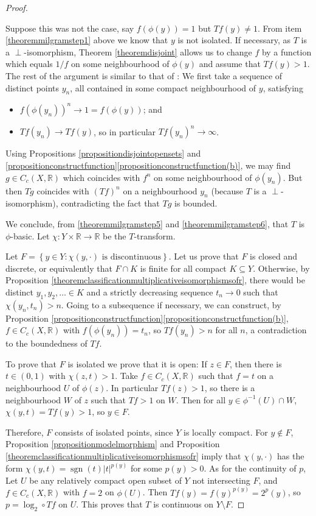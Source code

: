\documentclass[letter,11pt]{amsart}
\theoremstyle{plain}		\newtheorem{theorem}[generalnumbering]{Theorem}
\theoremstyle{plain}		\newtheorem{corollary}[generalnumbering]{Corollary}
\theoremstyle{definition}		\newtheorem{definition}[generalnumbering]{Definition}
\theoremstyle{definition}		\newtheorem{example}[generalnumbering]{Example}
\theoremstyle{plain}		\newtheorem{proposition}[generalnumbering]{Proposition}
\theoremstyle{plain}		\newtheorem{lemma}[generalnumbering]{Lemma}
\theoremstyle{definition}
\begin{document}
\begin{proof}
\begin{enumerate}[label=\arabic*.]
		Suppose this was not the case, say $f(\phi(y))=1$ but $Tf(y)\neq 1$. From item \ref{theoremmilgramstep1} above we know that $y$ is not isolated. If necessary, as $T$ is a $\perp$-isomorphism, Theorem \ref{theoremdisjoint} allows us to change $f$ by a function which equals $1/f$ on some neighbourhood of $\phi(y)$ and assume that $Tf(y)>1$. The rest of the argument is similar to that of \cite[Lemma 4.1]{MR0029476}: We first take a sequence of distinct points $y_n$, all contained in some compact neighbourhood of $y$, satisfying
		\begin{itemize}
			\item $f(\phi(y_n))^n\to 1=f(\phi(y))$; and 
			\item $Tf(y_n)\to Tf(y)$, so in particular $Tf(y_n)^n\to\infty$.
		\end{itemize}
		Using Propositions \ref{propositiondisjointopensets} and \ref{propositionconstructfunction}\ref{propositionconstructfunction(b)}, we may find $g\in C_c(X,\mathbb{R})$ which coincides with $f^n$ on some neighbourhood of $\phi(y_n)$. But then $Tg$ coincides with $(Tf)^n$ on a neighbourhood $y_n$ (because $T$ is a $\perp$-isomorphism), contradicting the fact that $Tg$ is bounded.
	\end{enumerate}
	
	We conclude, from \ref{theoremmilgramstep5} and \ref{theoremmilgramstep6}, that $T$ is $\phi$-basic. Let $\chi\colon Y\times\mathbb{R}\to\mathbb{R}$ be the $T$-transform.
	
	Let $F=\left\{y\in Y:\chi(y,\cdot)\text{ is discontinuous}\right\}$. Let us prove that $F$ is closed and discrete, or equivalently that $F\cap K$ is finite for all compact $K\subseteq Y$. Otherwise, by Proposition \ref{theoremclassificationmultiplicativeisomorphismsofr}, there would be distinct $y_1,y_2,\ldots\in K$ and a strictly decreasing sequence $t_n\to 0$ such that $\chi(y_n,t_n)>n$. Going to a subsequence if necessary, we can construct, by Proposition \ref{propositionconstructfunction}\ref{propositionconstructfunction(b)}, $f\in C_c(X,\mathbb{R})$ with $f(\phi(y_n))=t_n$, so $Tf(y_n)>n$ for all $n$, a contradiction to the boundedness of $Tf$.
	
	To prove that $F$ is isolated we prove that it is open: If $z\in F$, then there is $t\in(0,1)$ with $\chi(z,t)>1$. Take $f\in C_c(X,\mathbb{R})$ such that $f=t$ on a neighbourhood $U$ of $\phi(z)$. In particular $Tf(z)>1$, so there is a neighbourhood $W$ of $z$ such that $Tf>1$ on $W$. Then for all $y\in\phi^{-1}(U)\cap W$, $\chi(y,t)=Tf(y)>1$, so $y\in F$.
	
	Therefore, $F$ consists of isolated points, since $Y$ is locally compact. For $y\not\in F$, Proposition \ref{propositionmodelmorphism} and Proposition \ref{theoremclassificationmultiplicativeisomorphismsofr} imply that $\chi(y,\cdot)$ has the form $\chi(y,t)=\operatorname{sgn}(t)|t|^{p(y)}$ for some $p(y)>0$. As for the continuity of $p$, Let $U$ be any relatively compact open subset of $Y$ not intersecting $F$, and $f\in C_c(X,\mathbb{R})$ with $f=2$ on $\phi(U)$. Then $Tf(y)=f(y)^{p(y)}=2^p(y)$, so $p=\log_{2}\circ Tf$ on $U$. This proves that $T$ is continuous on $Y\setminus F$.\qedhere
\end{proof}
\end{document}
